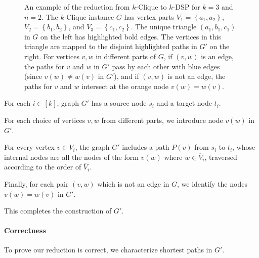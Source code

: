 \documentclass[11pt]{article}
\newcommand{\set}[1]{\left\{#1\right\}}
\renewcommand{\bar}{\overline}
\theoremstyle{definition}
\begin{document}
\begin{figure}[t]
\begin{tikzpicture}
\end{tikzpicture}
    \caption{An example of the reduction from \textsf{$k$-Clique} to \textsf{$k$-DSP} for $k=3$ and $n=2$.
    The \textsf{$k$-Clique} instance $G$ has vertex parts $V_1 = \set{a_1, a_2}$, $V_2 = \set{b_1, b_2}$, and $V_3 = \set{c_1, c_2}$. 
    The unique triangle $(a_1,b_1,c_1)$ in $G$ on the left has  highlighted bold edges. The vertices in this triangle are mapped to the disjoint highlighted paths in $G'$ on the right. For vertices $v,w$ in different parts of $G$, if $(v,w)$ is an edge, the paths for $v$ and $w$ in $G'$ pass by each other with blue edges (since $v(w)\neq w(v)$ in $G'$), and if $(v,w)$ is not an edge, the paths for $v$ and $w$ intersect at the orange node $v(w) = w(v)$. }
    \label{fig:dsp-reduction}
\end{figure}

For each $i\in[k]$, graph $G'$ has a source node $s_i$ and a target node $t_i$.

For each choice of vertices $v,w$ from different parts, we introduce node $v(w)$ in $G'$.

For every vertex $v\in V_i$, the graph $G'$ includes a path $P(v)$ from $s_i$ to $t_i$, whose internal nodes are all the nodes  of the form $v(w)$ where $w\in\bar{V}_i$, traversed according to the order of $\bar{V}_i$.

Finally, for each pair $(v,w)$ which is not an edge in $G$, we identify the nodes $v(w)=w(v)$ in $G'$.

This completes the construction of $G'$.

\paragraph{Correctness}

To prove our reduction is correct, we characterize shortest paths in $G'$.
\end{document}

